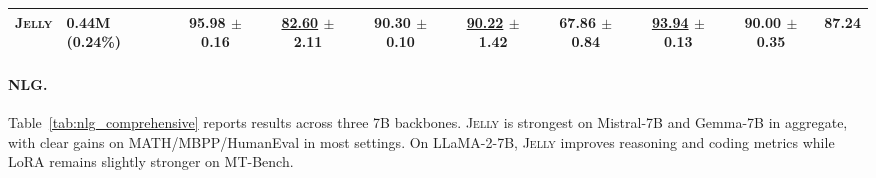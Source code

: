 \documentclass{article}
\newcommand{\jelly}{\textsc{Jelly}}
\begin{document}
\begin{table}[!ht]
{\begin{tabular}{llcccccccc}
\midrule
\textbf{\jelly{}} & 0.44M (0.24\%) & \textbf{95.98} \scriptsize{$\pm$ 0.16} & \underline{82.60} \scriptsize{$\pm$ 2.11} & \textbf{90.30} \scriptsize{$\pm$ 0.10} & \underline{90.22} \scriptsize{$\pm$ 1.42} & \textbf{67.86} \scriptsize{$\pm$ 0.84} & \underline{93.94} \scriptsize{$\pm$ 0.13} & 90.00 \scriptsize{$\pm$ 0.35} & \textbf{87.24} \\
\bottomrule
\end{tabular}}
\end{table}

\paragraph{NLG.}
Table~\ref{tab:nlg_comprehensive} reports results across three 7B backbones.
\jelly{} is strongest on Mistral-7B and Gemma-7B in aggregate, with clear gains on MATH/MBPP/HumanEval in most settings.
On LLaMA-2-7B, \jelly{} improves reasoning and coding metrics while LoRA remains slightly stronger on MT-Bench.
\end{document}
